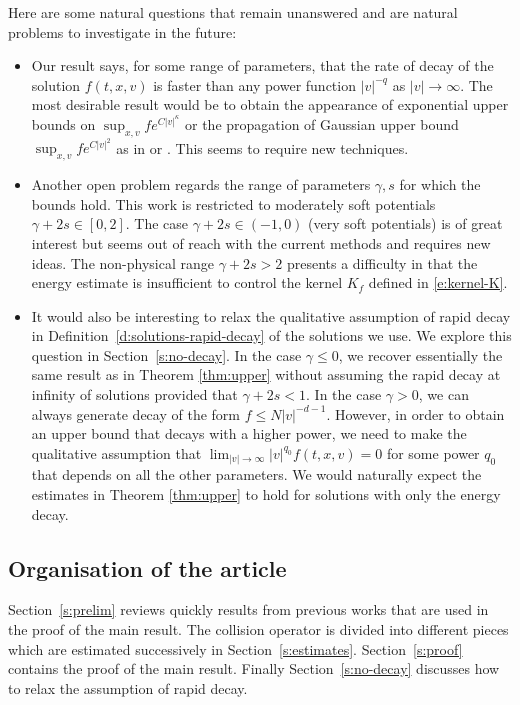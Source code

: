\documentclass[JEP,XML,SOM,Unicode,NoFloatCountersInSection]{cedram}
\theoremstyle{plain}
\theoremstyle{definition}
\numberwithin{equation}{section}
\let\A N
\begin{document}
Here are some natural questions that remain unanswered and are natural
problems to investigate in the future:
\begin{itemize}
\item Our result says, for some range of parameters, that the rate of
decay of the solution $f(t,x,v)$ is faster than any power function
$|v|^{-q}$ as $|v| \to \infty$. The most desirable result would be
to obtain the appearance of exponential upper bounds on
$\sup_{x,v} f e^{C|v|^\kappa}$ or the propagation of Gaussian upper
bound $\sup_{x,v} f e^{C |v|^2}$ as in
\cite{gamba-panferov-villani-2009} or \cite{css}. This seems to
require new techniques.
\item Another open problem regards the range of parameters $\gamma,s$
for which the bounds hold. This work is restricted to moderately
soft potentials $\gamma+2s \in [0,2]$. The case
$\gamma+2s \in (-1,0)$ (very soft potentials) is of great interest
but seems out of reach with the current methods and requires new
ideas. The non-physical range $\gamma+2s > 2$ presents a difficulty
in that the energy estimate is insufficient to control the kernel
$K_f$ defined in \eqref{e:kernel-K}.
\item It would also be interesting to relax the qualitative assumption
of rapid decay in Definition~\ref{d:solutions-rapid-decay} of the
solutions we use. We explore this question in
Section~\ref{s:no-decay}. In the case $\gamma \leq 0$, we recover
essentially the same result as in Theorem \ref{thm:upper} without
assuming the rapid decay at infinity of solutions provided that
$\gamma+2s < 1$. In the case $\gamma > 0$, we can always generate
decay of the form $f \leq \A |v|^{-d-1}$. However, in order to
obtain an upper bound that decays with a higher power, we need to
make the qualitative assumption that
$\lim_{|v| \to \infty} |v|^{q_0} f(t,x,v) = 0$ for some power $q_0$
that depends on all the other parameters. We would naturally expect
the estimates in Theorem \ref{thm:upper} to hold for solutions with
only the energy decay.
\end{itemize}

\subsection{Organisation of the article}
Section~\ref{s:prelim} reviews quickly results from previous works
that are used in the proof of the main result. The collision operator
is divided into different pieces which are estimated successively in
Section~\ref{s:estimates}. Section~\ref{s:proof} contains the proof of
the main result. Finally Section~\ref{s:no-decay} discusses how to
relax the assumption of rapid decay.
\end{document}
